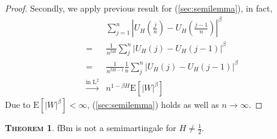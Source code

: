 \documentclass[a4paper, twoside, 11pt]{article}
\theoremstyle{definition}
\newtheorem{theorem}[definition]{\scshape Theorem}
\begin{document}
\begin{proof}
	Secondly, we apply previous result for (\ref{sec:semilemma}), in fact,
	\begin{eqnarray*}
		&&\sum_{j=1}^n |U_H(\frac{j}{n}) - U_H(\frac{j-1}{n})|^\beta\\
		&=& \frac{1}{n^{\beta H}} \sum_{j}^n|U_H(j) - U_H(j-1)|^\beta\\
		&=& \frac{1}{n^{\beta H-1}} \frac{1}{n}\sum_{j}^n|U_H(j) - U_H(j-1)|^\beta\\
		&\overset{\text{in }\mathrm{L}^2}{\longrightarrow}& n^{1-\beta H}\mathrm{E}[|W|^\beta]
	  \end{eqnarray*}
	  Due to $\mathrm{E}[|W|^\beta] < \infty$, (\ref{sec:semilemma}) holds as well as $n\rightarrow \infty$.
\end{proof}
\begin{theorem}
  fBm is not a semimartingale for $H\neq \frac{1}{2}$.
\end{theorem}
\end{document}
